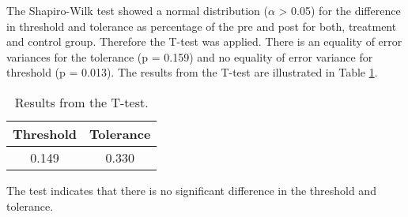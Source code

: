 The Shapiro-Wilk test showed a normal distribution ($\alpha$ > 0.05) for the difference in threshold and tolerance as percentage of the pre and post for both, treatment and control group. Therefore the T-test was applied. There is an equality of error variances for the tolerance (p = 0.159) and no equality of error variance for threshold (p = 0.013). The results from the T-test are illustrated in Table \ref{table:TTEST}. 

\begin{table}[ht]
\caption{Results from the T-test.}
\centering
\begin{tabular}{c c}
\hline\hline
\textbf{Threshold} & \textbf{Tolerance} \\ [0.5ex] %
\hline
 0.149 &  0.330 \\
\hline
\end{tabular}
\label{table:TTEST}
\end{table}

The test indicates that there is no significant difference in the threshold and tolerance.